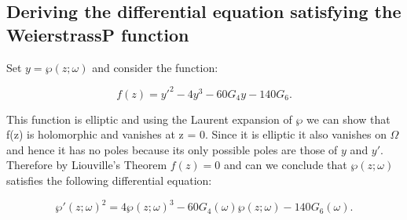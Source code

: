 \subsection{Deriving the differential equation satisfying the WeierstrassP function}

Set $y=\wp(z; \omega)$ and consider the function:

\[
    f(z) = y'^{2} - 4y^3 - 60G_4 y - 140G_6.
\]

This function is elliptic and using the Laurent expansion of $\wp$ we can show that f(z) is holomorphic
and vanishes at z = 0. Since it is elliptic it also vanishes on $\Omega$ and hence it has no poles because its only
possible poles are those of $y$ and $y'$. Therefore by Liouville's Theorem $f(z)=0$ and can we conclude that
$\wp(z; \omega)$ satisfies the following differential equation:

\[
    \wp'(z; \omega)^2 = 4 \wp(z; \omega)^3 - 60G_4(\omega)\wp(z; \omega) - 140G_6(\omega).
\]